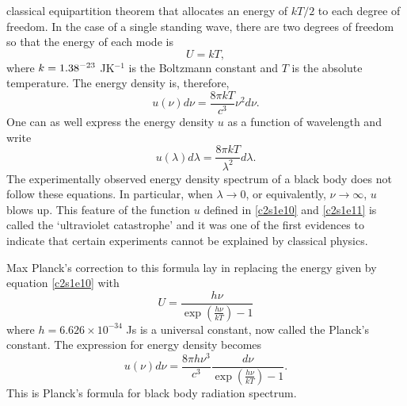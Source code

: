 classical equipartition theorem that allocates an energy of $kT/2$ to each
degree of freedom. In the case of a single standing wave, there are two degrees
of freedom so that the energy of each mode is
\begin{equation}\label{c2s1e10}
U = kT,
\end{equation}
where $k = 1.38 \time 10^{-23}$ JK${}^{-1}$ is the Boltzmann constant and $T$
is the absolute temperature. The energy density is, therefore,
\begin{equation}\label{c2s1e11}
u(\nu)d\nu = \frac{8\pi kT}{c^3}\nu^2 d\nu.
\end{equation}
One can as well express the energy density $u$ as a function of wavelength and
write
\begin{equation}\label{c2s1e12}
u(\lambda)d\lambda = \frac{8\pi kT}{\lambda^2}d\lambda.
\end{equation}
The experimentally observed energy density spectrum of a black body does not
follow these equations. In particular, when $\lambda \rightarrow 0$, or 
equivalently, $\nu \rightarrow \infty$, $u$ blows up. This feature of the 
function $u$ defined in \eqref{c2s1e10} and \eqref{c2s1e11} is called the
`ultraviolet catastrophe' and it was one of the first evidences to indicate 
that certain experiments cannot be explained by classical physics.

Max Planck's correction to this formula lay in replacing the energy given by
equation \eqref{c2s1e10} with
\begin{equation}\label{c2s1e13}
U = \frac{h\nu}{\exp(\frac{h\nu}{kT}) - 1}
\end{equation}
where $h = 6.626 \times 10^{-34}$ Js is a universal constant, now called the
Planck's constant. The expression for energy density becomes
\begin{equation}\label{c2s1e14}
u(\nu)d\nu = \frac{8\pi h\nu^3}{c^3}\frac{d\nu}{\exp(\frac{h\nu}{kT}) - 1}.
\end{equation}
This is Planck's formula for black body radiation spectrum. 

